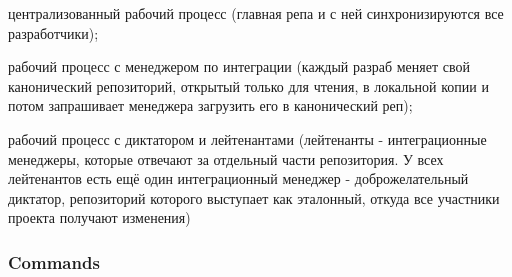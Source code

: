 централизованный рабочий процесс (главная репа и с ней синхронизируются все разработчики); 

рабочий процесс с менеджером по интеграции (каждый разраб меняет свой канонический репозиторий, открытый только для чтения, в локальной копии и потом запрашивает менеджера загрузить его в канонический реп);

рабочий процесс с диктатором и лейтенантами (лейтенанты - интеграционные менеджеры, которые отвечают за отдельный части репозитория. У всех лейтенантов есть ещё один интеграционный менеджер - доброжелательный диктатор, репозиторий которого выступает как эталонный, откуда все участники проекта получают изменения)

\subsubsection{Commands}

